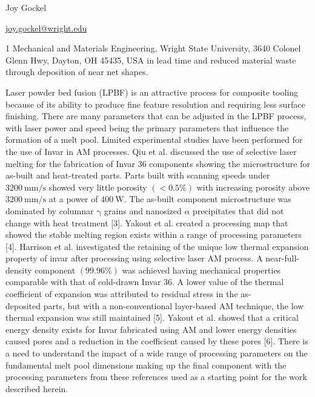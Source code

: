\documentclass[10pt]{article}
\begin{document}
Joy Gockel

\href{mailto:joy.gockel@wright.edu}{joy.gockel@wright.edu}

1 Mechanical and Materials Engineering, Wright State University, 3640 Colonel Glenn Hwy, Dayton, OH 45435, USA in lead time and reduced material waste through deposition of near net shapes.

Laser powder bed fusion (LPBF) is an attractive process for composite tooling because of its ability to produce fine feature resolution and requiring less surface finishing. There are many parameters that can be adjusted in the LPBF process, with laser power and speed being the primary parameters that influence the formation of a melt pool. Limited experimental studies have been performed for the use of Invar in AM processes. Qiu et al. discussed the use of selective laser melting for the fabrication of Invar 36 components showing the microstructure for as-built and heat-treated parts. Parts built with scanning speeds under $3200 \mathrm{~mm} / \mathrm{s}$ showed very little porosity $(<0.5 \%)$ with increasing porosity above $3200 \mathrm{~mm} / \mathrm{s}$ at a power of $400 \mathrm{~W}$. The as-built component microstructure was dominated by columnar $\mathrm{\gamma}$ grains and nanosized $\alpha$ precipitates that did not change with heat treatment [3]. Yakout et al. created a processing map that showed the stable melting region exists within a range of processing parameters [4]. Harrison et al. investigated the retaining of the unique low thermal expansion property of invar after processing using selective laser AM process. A near-full-density component $(99.96 \%)$ was achieved having mechanical properties comparable with that of cold-drawn Invar 36. A lower value of the thermal coefficient of expansion was attributed to residual stress in the as-\\
deposited parts, but with a non-conventional layer-based AM technique, the low thermal expansion was still maintained [5]. Yakout et al. showed that a critical energy density exists for Invar fabricated using AM and lower energy densities caused pores and a reduction in the coefficient caused by these pores [6]. There is a need to understand the impact of a wide range of processing parameters on the fundamental melt pool dimensions making up the final component with the processing parameters from these references used as a starting point for the work described herein.
\end{document}
